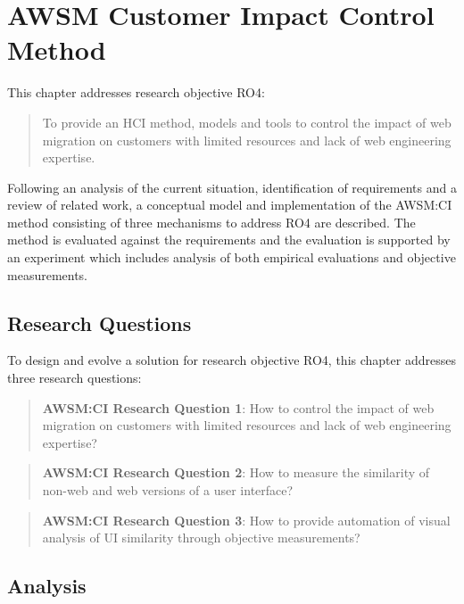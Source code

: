 \hypertarget{sec:awsm-ci}{%
\chapter{AWSM Customer Impact Control Method}\label{sec:awsm-ci}}

This chapter addresses research objective RO4:

\begin{quote}
To provide an HCI method, models and tools to control the impact of web migration on customers with limited resources and lack of web engineering expertise.
\end{quote}

Following an analysis of the current situation, identification of requirements and a review of related work, a conceptual model and implementation of the AWSM:CI method consisting of three mechanisms to address RO4 are described.
The method is evaluated against the requirements and the evaluation is supported by an experiment which includes analysis of both empirical evaluations and objective measurements.

\hypertarget{research-questions}{%
\section{Research Questions}\label{research-questions}}

To design and evolve a solution for research objective RO4, this chapter addresses three research questions:

\begin{quote}
\textbf{AWSM:CI Research Question 1}: How to control the impact of web migration on customers with limited resources and lack of web engineering expertise?
\end{quote}

\begin{quote}
\textbf{AWSM:CI Research Question 2}: How to measure the similarity of non-web and web versions of a user
interface?
\end{quote}

\begin{quote}
\textbf{AWSM:CI Research Question 3}: How to provide automation of visual analysis of UI similarity through objective measurements?
\end{quote}

\hypertarget{analysis}{%
\section{Analysis}\label{analysis}}


